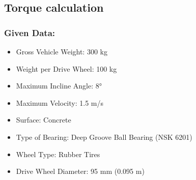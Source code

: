 \documentclass[../../main]{subfiles}
\begin{document}
\subsection{Torque calculation}

\subsubsection{Given Data:}
\begin{itemize}
\item
  Gross Vehicle Weight: 300 kg
\item
  Weight per Drive Wheel: 100 kg
\item
  Maximum Incline Angle: 8°
\item
  Maximum Velocity: 1.5 m/s
\item
  Surface: Concrete
\item
  Type of Bearing: Deep Groove Ball Bearing (NSK 6201)
\item
  Wheel Type: Rubber Tires
\item
  Drive Wheel Diameter: 95 mm (0.095 m)
\end{itemize}
\end{document}
